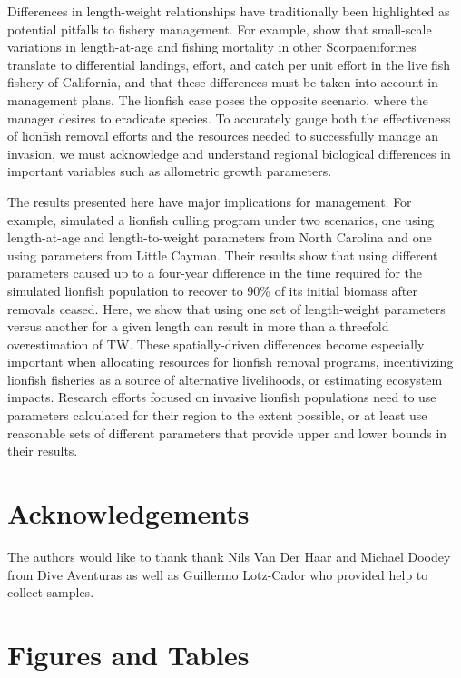 \documentclass[12pt,]{article}
\theoremstyle{definition}
\theoremstyle{definition}
\theoremstyle{definition}
\theoremstyle{remark}
\begin{document}
Differences in length-weight relationships have traditionally been
highlighted as potential pitfalls to fishery management. For example,
\citet{wilson_2012} show that small-scale variations in length-at-age
and fishing mortality in other Scorpaeniformes translate to differential
landings, effort, and catch per unit effort in the live fish fishery of
California, and that these differences must be taken into account in
management plans. The lionfish case poses the opposite scenario, where
the manager desires to eradicate species. To accurately gauge both the
effectiveness of lionfish removal efforts and the resources needed to
successfully manage an invasion, we must acknowledge and understand
regional biological differences in important variables such as
allometric growth parameters.

The results presented here have major implications for management. For
example, \citet{edwards_2014} simulated a lionfish culling program under
two scenarios, one using length-at-age and length-to-weight parameters
from North Carolina and one using parameters from Little Cayman. Their
results show that using different parameters caused up to a four-year
difference in the time required for the simulated lionfish population to
recover to 90\% of its initial biomass after removals ceased. Here, we
show that using one set of length-weight parameters versus another for a
given length can result in more than a threefold overestimation of TW.
These spatially-driven differences become especially important when
allocating resources for lionfish removal programs, incentivizing
lionfish fisheries as a source of alternative livelihoods, or estimating
ecosystem impacts. Research efforts focused on invasive lionfish
populations need to use parameters calculated for their region to the
extent possible, or at least use reasonable sets of different parameters
that provide upper and lower bounds in their results.

\section{Acknowledgements}\label{acknowledgements}

The authors would like to thank thank Nils Van Der Haar and Michael
Doodey from Dive Aventuras as well as Guillermo Lotz-Cador who provided
help to collect samples.



\section{Figures and Tables}\label{figures-and-tables}
\end{document}
